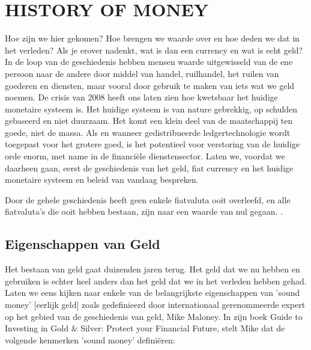 \chapter{HISTORY OF MONEY}
\label{ch:historyofmoney}

Hoe zijn we hier gekomen? Hoe brengen we waarde over en hoe deden we dat in het verleden? Als je erover nadenkt, wat is dan een currency en wat is echt geld? In de loop van de geschiedenis hebben mensen waarde uitgewisseld van de ene persoon naar de andere door middel van handel, ruilhandel, het ruilen van goederen en diensten, maar vooral door gebruik te maken van iets wat we geld noemen. De crisis van 2008 heeft ons laten zien hoe kwetsbaar het huidige monetaire systeem is. Het huidige systeem is van nature gebrekkig, op schulden gebaseerd en niet duurzaam. Het komt een klein deel van de maatschappij ten goede, niet de massa. Als en wanneer gedistribueerde ledgertechnologie wordt toegepast voor het grotere goed, is het potentieel voor verstoring van de huidige orde enorm, met name in de financi\"ele dienstensector. Laten we, voordat we daarheen gaan, eerst de geschiedenis van het geld, fiat currency en het huidige monetaire systeem en beleid van vandaag bespreken.

\bigskip
\bigskip
{}
    \begin{tcolorbox}
    [enhanced,
    title=All Fiat Currencies become Worthless,
    frame style=
    {left color=orange!85!black,right color=yellow!95!black}]
    
      Door de gehele geschiedenis heeft geen enkele fiatvaluta ooit overleefd, en alle fiatvaluta's die ooit hebben bestaan, zijn naar een waarde van nul gegaan. \parencite{thebigreset}.
\end{tcolorbox}
\bigskip


\section{Eigenschappen van Geld}
Het bestaan van geld gaat duizenden jaren terug. Het geld dat we nu hebben en gebruiken is echter heel anders dan het geld dat we in het verleden hebben gehad. Laten we eens kijken naar enkele van de belangrijkste eigenschappen van 'sound money' [eerlijk geld] zoals gedefinieerd door internationaal gerenommeerde expert op het gebied van de geschiedenis van geld, Mike Maloney. In zijn boek Guide to Investing in Gold \& Silver: Protect your Financial Future, stelt Mike dat de volgende kenmerken 'sound money' defini\"eren:

